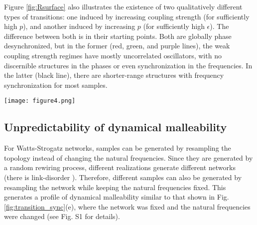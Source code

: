 Figure \ref{fig:Rsurface} also illustrates the existence of two qualitatively different types of transitions: one induced by increasing coupling strength (for sufficiently high $p$), and another induced by increasing $p$ (for sufficiently high $\epsilon$). The difference between both is in their starting points. Both are globally phase desynchronized, but in the former (red, green, and purple lines), the weak coupling strength regimes have mostly uncorrelated oscillators, with no discernible structures in the phases or even synchronization in the frequencies. In the latter (black line), there are shorter-range structures with frequency synchronization for most samples.
%
\begin{figure*}[htb!]
    \centering
    \texttt{[image: figure4.png]}
    \caption{\textbf{Dynamical malleability increases around the regions of transition to phase synchronization.} The surface on the left shows the average degree of phase synchronization $\overline{R}$ across the ensemble ($1000$ realizations of shuffled natural frequencies). The region of high phase synchronization is clearly seen for sufficiently high coupling strength $\epsilon$ and rewiring probability $p$. The colored lines correspond to the parameter values shown in Fig. \ref{fig:transition_sync}. The right panel displays $\Delta$, the difference between the most and least synchronized realizations for each pair $(p, \epsilon$), and we see that the fluctuations from sample to sample increase during the transitions to phase synchronization. The green and purple curves remain close to the region of transition for all $\epsilon \gtrapprox 1$, such that their fluctuations do not decrease with an increase in $\epsilon$. The figure uses Gouraud interpolation to ease visualization by smoothing the curves with a linear interpolation.}
    \label{fig:Rsurface}
\end{figure*}

\subsection{Unpredictability of dynamical malleability}
For Watts-Strogatz networks, samples can be generated by resampling the topology instead of changing the natural frequencies. Since they are generated by a random rewiring process, different realizations generate different networks (there is link-disorder \cite{hong2013link}). Therefore, different samples can also be generated by resampling the network while keeping the natural frequencies fixed. This generates a profile of dynamical malleability similar to that shown in Fig. \ref{fig:transition_sync}(e), where the network was fixed and the natural frequencies were changed (see Fig. S1 for details). 

